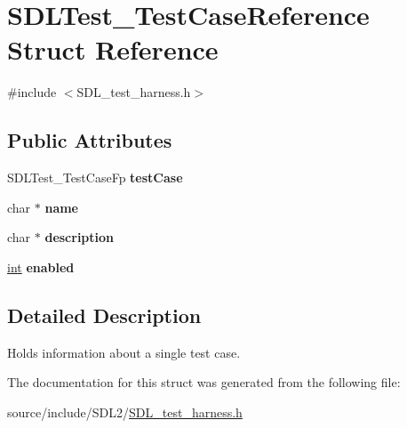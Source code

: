\hypertarget{struct_s_d_l_test___test_case_reference}{}\section{S\+D\+L\+Test\+\_\+\+Test\+Case\+Reference Struct Reference}
\label{struct_s_d_l_test___test_case_reference}


{\ttfamily \#include $<$S\+D\+L\+\_\+test\+\_\+harness.\+h$>$}

\subsection*{Public Attributes}
\begin{DoxyCompactItemize}
\item 
\hypertarget{struct_s_d_l_test___test_case_reference_af9472f0c421a2845b540fc28fb30a3ef}{}S\+D\+L\+Test\+\_\+\+Test\+Case\+Fp {\bfseries test\+Case}\label{struct_s_d_l_test___test_case_reference_af9472f0c421a2845b540fc28fb30a3ef}

\item 
\hypertarget{struct_s_d_l_test___test_case_reference_aabd588c915c52fb13bcd0c71e071a604}{}char $\ast$ {\bfseries name}\label{struct_s_d_l_test___test_case_reference_aabd588c915c52fb13bcd0c71e071a604}

\item 
\hypertarget{struct_s_d_l_test___test_case_reference_a1ee6c8a2529fdfcd62bb1483c26be67d}{}char $\ast$ {\bfseries description}\label{struct_s_d_l_test___test_case_reference_a1ee6c8a2529fdfcd62bb1483c26be67d}

\item 
\hypertarget{struct_s_d_l_test___test_case_reference_a15168c85e38cae7557b4beb477ef6f9a}{}\hyperlink{_s_d_l__thread_8h_a6a64f9be4433e4de6e2f2f548cf3c08e}{int} {\bfseries enabled}\label{struct_s_d_l_test___test_case_reference_a15168c85e38cae7557b4beb477ef6f9a}

\end{DoxyCompactItemize}


\subsection{Detailed Description}
Holds information about a single test case. 

The documentation for this struct was generated from the following file\+:\begin{DoxyCompactItemize}
\item 
source/include/\+S\+D\+L2/\hyperlink{_s_d_l__test__harness_8h}{S\+D\+L\+\_\+test\+\_\+harness.\+h}\end{DoxyCompactItemize}
